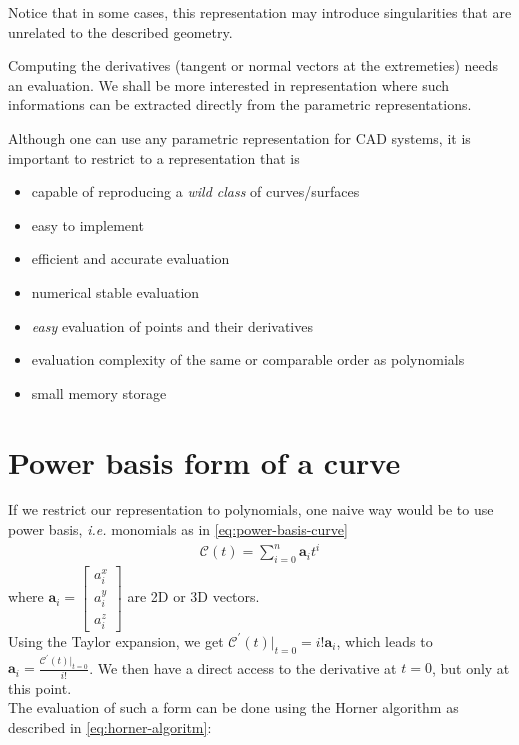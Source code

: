 \begin{remark}
  Notice that in some cases, this representation may introduce singularities that are unrelated to the described geometry.
\end{remark}

\begin{remark}
  Computing the derivatives (tangent or normal vectors at the extremeties) needs an evaluation. We shall be more interested in representation where such informations can be extracted directly from the parametric representations.
\end{remark}

Although one can use any parametric representation for CAD systems, it is important to restrict to a representation that is
\begin{itemize}
  \item capable of reproducing a \textit{wild class} of curves/surfaces
  \item easy to implement
  \item efficient and accurate evaluation 
  \item numerical stable evaluation
  \item \textit{easy} evaluation of points and their derivatives
  \item evaluation complexity of the same or comparable order as polynomials
  \item small memory storage
\end{itemize}

\section{Power basis form of a curve}
If we restrict our representation to polynomials, one naive way would be to use power basis, \textit{i.e.} monomials as in \ref{eq:power-basis-curve}
\begin{align}
  \mathcal{C}(t) = \sum_{i=0}^n \mathbf{a}_i t^i
  \label{eq:power-basis-curve}
\end{align}
where $\mathbf{a}_i = 
\begin{bmatrix}
  a_i^x \\ a_i^y \\ a_i^z
\end{bmatrix}
$ are 2D or 3D vectors.
\\
\noindent
Using the Taylor expansion, we get $\mathcal{C}^\prime(t)|_{t=0} = i! \mathbf{a}_i$, which leads to $\mathbf{a}_i = \frac{\mathcal{C}^\prime(t)|_{t=0}}{i!}$. We then have a direct access to the derivative at $t=0$, but only at this point.
\\
\noindent
The evaluation of such a form can be done using the Horner algorithm as described in \ref{eq:horner-algoritm}:

